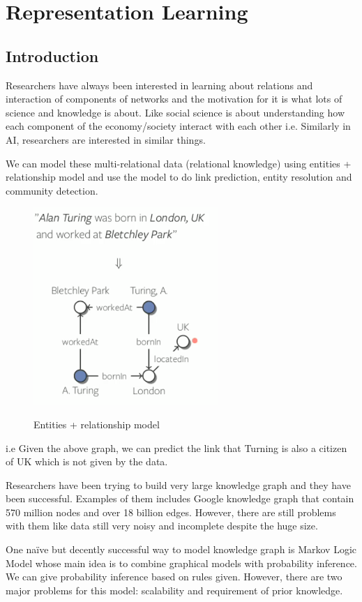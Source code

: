 \chapter{Representation Learning}

\section{Introduction}

Researchers have always been interested in learning about relations and interaction of components of networks and the motivation for it is what lots of science and knowledge is about. Like social science is about understanding how each component of the economy/society interact with each other i.e. Similarly in AI, researchers are interested in similar things. 

We can model these multi-relational data (relational knowledge) using entities + relationship model and use the model to do link prediction, entity resolution and community detection. 
\begin{figure}[htb!]
\centering
\includegraphics[width=0.5\linewidth]{figs/slides2.PNG}
\label{fig:tag_overlap}
\caption{Entities + relationship model}
\end{figure}
i.e Given the above graph, we can predict the link that Turning is also a citizen of UK which is not given by the data.

Researchers have been trying to build very large knowledge graph and they have been successful. Examples of them includes Google knowledge graph that contain 570 million nodes and over 18 billion edges. However, there are still problems with them like data still very noisy and incomplete despite the huge size.

One naïve but decently successful way to model knowledge graph is Markov Logic Model whose main idea is to combine graphical models with probability inference. We can give probability inference based on rules given. However, there are two major problems for this model: scalability and requirement of prior knowledge.

